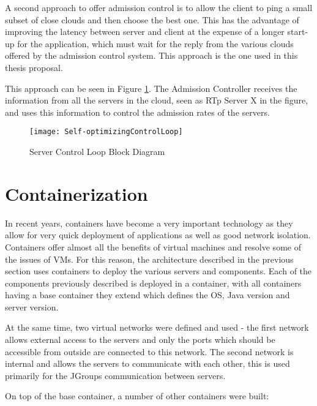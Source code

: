A second approach to offer admission control is to allow the client to ping a small subset of close clouds and then choose the best one. This has the advantage of improving the latency between server and client at the expense of a longer start-up for the application, which must wait for the reply from the various clouds offered by the admission control system. This approach is the one used in this thesis proposal.

This approach can be seen in Figure \ref{fig:servercontrolloop}. The Admission Controller receives the information from all the servers in the cloud, seen as RTp Server X in the figure, and uses this information to control the admission rates of the servers.

\begin{figure}
	\centering
		\texttt{[image: Self-optimizingControlLoop]}
	\caption{Server Control Loop Block Diagram}
	\label{fig:servercontrolloop}
\end{figure}

\section{Containerization}

In recent years, containers have become a very important technology as they allow for very quick deployment of applications as well as good network isolation. Containers offer almost all the benefits of virtual machines and resolve some of the issues of VMs. For this reason, the architecture described in the previous section uses containers to deploy the various servers and components. Each of the components previously described is deployed in a container, with all containers having a base container they extend which defines the OS, Java version and server version. 

At the same time, two virtual networks were defined and used - the first network allows external access to the servers and only the ports which should be accessible from outside are connected to this network. The second network is internal and allows the servers to communicate with each other, this is used primarily for the JGroups communication between servers.

On top of the base container, a number of other containers were built:

